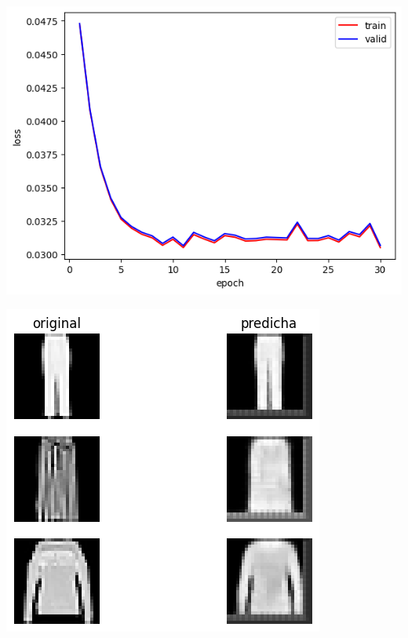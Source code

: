 \documentclass[aps,prl,reprint,groupedaddress]{revtex4-2}
\newenvironment{Figura}
  {\par\medskip\noindent\minipage{\linewidth}}
  {\endminipage\par\medskip}
\begin{document}
\begin{Figura}
  \centering
  \begin{minipage}[t]{0.58\linewidth}
    \centering
    \includegraphics[width=\textwidth]{figs1/modelo_n64_dropout01.png}
    \label{fig-model-dropout01}
  \end{minipage}%
  \hfill
  \begin{minipage}[t]{0.41\linewidth}
    \centering
    \includegraphics[width=\textwidth]{figs1/test_modelo_n64_dropout_01.png}
    \label{fig-model-dropout05b}
  \end{minipage}
\end{Figura}
\end{document}
